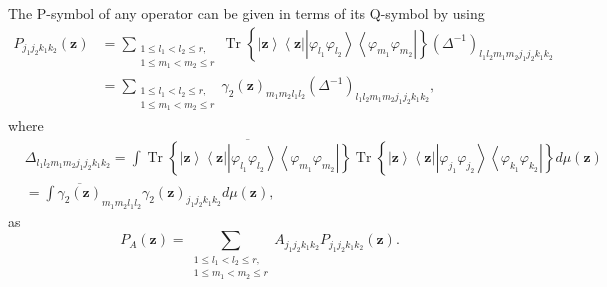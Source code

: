 \documentclass[aps,preprint]{revtex4}%
\begin{document}
The P-symbol of any operator can be given in terms of its Q-symbol by using
\begin{align}
P_{j_{1}j_{2}k_{1}k_{2}}\left(  \mathbf{z}\right)   &  =\sum_{\substack{1\leq
l_{1}<l_{2}\leq r,\\1\leq m_{1}<m_{2}\leq r}}\operatorname*{Tr}\left\{
\left\vert \mathbf{z}\right\rangle \left\langle \mathbf{z}\right\vert
\left\vert \varphi_{l_{1}}\varphi_{l_{2}}\right\rangle \left\langle
\varphi_{m_{1}}\varphi_{m_{2}}\right\vert \right\}  \left(  \Delta
^{-1}\right)  _{l_{1}l_{2}m_{1}m_{2}j_{1}j_{2}k_{1}k_{2}}\nonumber\\
&  =\sum_{\substack{1\leq l_{1}<l_{2}\leq r,\\1\leq m_{1}<m_{2}\leq r}%
}\gamma_{2}\left(  \mathbf{z}\right)  _{m_{1}m_{2}l_{1}l_{2}}\left(
\Delta^{-1}\right)  _{l_{1}l_{2}m_{1}m_{2}j_{1}j_{2}k_{1}k_{2}},
\end{align}
where%
\begin{align}
&  \Delta_{l_{1}l_{2}m_{1}m_{2}j_{1}j_{2}k_{1}k_{2}}=\int\overline
{\operatorname*{Tr}\left\{  \left\vert \mathbf{z}\right\rangle \left\langle
\mathbf{z}\right\vert \left\vert \varphi_{l_{1}}\varphi_{l_{2}}\right\rangle
\left\langle \varphi_{m_{1}}\varphi_{m_{2}}\right\vert \right\}
}\operatorname*{Tr}\left\{  \left\vert \mathbf{z}\right\rangle \left\langle
\mathbf{z}\right\vert \left\vert \varphi_{j_{1}}\varphi_{j_{2}}\right\rangle
\left\langle \varphi_{k_{1}}\varphi_{k_{2}}\right\vert \right\}  d\mu\left(
\mathbf{z}\right) \nonumber\\
&  =\int\overline{\gamma_{2}\left(  \mathbf{z}\right)  }_{m_{1}m_{2}l_{1}%
l_{2}}\gamma_{2}\left(  \mathbf{z}\right)  _{j_{1}j_{2}k_{1}k_{2}}d\mu\left(
\mathbf{z}\right)  ,
\end{align}
as
\begin{equation}
P_{A}\left(  \mathbf{z}\right)  =\sum_{\substack{1\leq l_{1}<l_{2}\leq
r,\\1\leq m_{1}<m_{2}\leq r}}A_{j_{1}j_{2}k_{1}k_{2}}P_{j_{1}j_{2}k_{1}k_{2}%
}\left(  \mathbf{z}\right)  .
\end{equation}
\qquad\qquad
\end{document}
